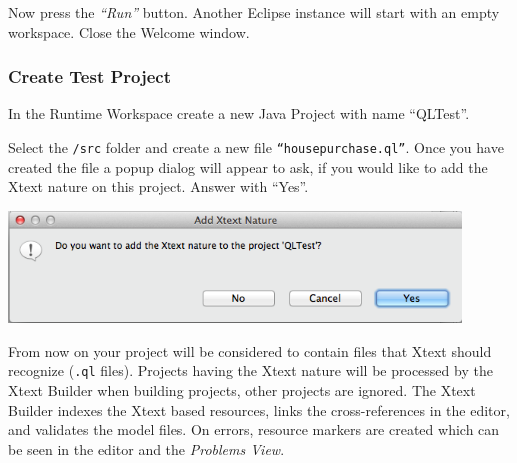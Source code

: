 Now press the \emph{``Run''} button. Another Eclipse instance will start with an
empty workspace. Close the Welcome window.


\subsubsection{Create Test Project}

In the Runtime Workspace create a new Java Project with name ``QLTest''.

Select the \texttt{/src} folder and create a new file
\texttt{``housepurchase.ql''}. Once you have created the file a popup dialog
will appear to ask, if you would like to add the Xtext nature on this project.
Answer with ``Yes''.

\includegraphics[width=12cm]{./images/chapter01/AddXtextNature.png}

From now on your project will be considered to contain files that Xtext should
recognize (\texttt{.ql} files). Projects having the Xtext nature will be processed by the
Xtext Builder when building projects, other projects are ignored. The Xtext
Builder indexes the Xtext based resources, links the cross-references in the
editor, and validates the model files. On errors, resource markers are created
which can be seen in the editor and the \emph{Problems View}.

